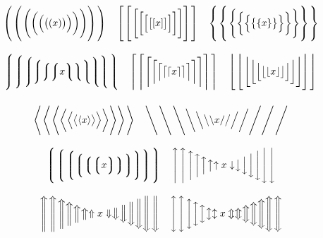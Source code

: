 $$
\Bigggl(\bigggl(\Biggl(\biggl(\Bigl(\bigl(({x})\bigr)\Bigr)\biggr)\Biggr)\bigggr)\Bigggr)
\quad 
\Bigggl[\bigggl[\Biggl[\biggl[\Bigl[\bigl[[{x}]\bigr]\Bigr]\biggr]\Biggr]\bigggr]\Bigggr]
\quad  
\Bigggl\{\bigggl\{\Biggl\{\biggl\{\Bigl\{\bigl\{\{{x}\}\bigr\}\Bigr\}\biggr\}\Biggr\}\bigggr\}\Bigggr\}
$$

$$
\Bigggl\lmoustache\bigggl\lmoustache\Biggl\lmoustache\biggl\lmoustache\Bigl\lmoustache\bigl\lmoustache %
{x}
\bigr\rmoustache\Bigr\rmoustache\biggr\rmoustache\Biggr\rmoustache\bigggr\rmoustache\Bigggr\rmoustache
\quad  
\Bigggl\lceil\bigggl\lceil\Biggl\lceil\biggl\lceil\Bigl\lceil\bigl\lceil\lceil{x}\rceil\bigr\rceil\Bigr\rceil\biggr\rceil\Biggr\rceil\bigggr\rceil\Bigggr\rceil
\quad  
\Bigggl\lfloor\bigggl\lfloor\Biggl\lfloor\biggl\lfloor\Bigl\lfloor\bigl\lfloor\lfloor{x}\rfloor\bigr\rfloor\Bigr\rfloor\biggr\rfloor\Biggr\rfloor\bigggr\rfloor\Bigggr\rfloor
$$

$$
\Bigggl\langle\bigggl\langle\Biggl\langle\biggl\langle\Bigl\langle\bigl\langle\langle{x}\rangle\bigr\rangle\Bigr\rangle\biggr\rangle\Biggr\rangle\bigggr\rangle\Bigggr\rangle
\quad  
\Bigggl\backslash\bigggl\backslash\Biggl\backslash\biggl\backslash\Bigl\backslash\bigl\backslash\backslash{x}/\bigr/\Bigr/\biggr/\Biggr/\bigggr/\Bigggr/
$$

$$
\Bigggl\lgroup\bigggl\lgroup\Biggl\lgroup\biggl\lgroup\Bigl\lgroup\bigl\lgroup
{x}
\bigr\rgroup\Bigr\rgroup\biggr\rgroup\Biggr\rgroup\bigggr\rgroup\Bigggr\rgroup
\quad  
\Bigggl\uparrow\bigggl\uparrow\Biggl\uparrow\biggl\uparrow\Bigl\uparrow\bigl\uparrow\uparrow{x}\downarrow\bigr\downarrow\Bigr\downarrow\biggr\downarrow\Biggr\downarrow\bigggr\downarrow\Bigggr\downarrow
$$

$$
\Bigggl\Uparrow\bigggl\Uparrow\Biggl\Uparrow\biggl\Uparrow\Bigl\Uparrow\bigl\Uparrow\Uparrow{x}\Downarrow\bigr\Downarrow\Bigr\Downarrow\biggr\Downarrow\Biggr\Downarrow\bigggr\Downarrow\Bigggr\Downarrow
\quad  
\Bigggl\updownarrow\bigggl\updownarrow\Biggl\updownarrow\biggl\updownarrow\Bigl\updownarrow\bigl\updownarrow\updownarrow{x}\Updownarrow\bigr\Updownarrow\Bigr\Updownarrow\biggr\Updownarrow\Biggr\Updownarrow\bigggr\Updownarrow\Bigggr\Updownarrow
$$

